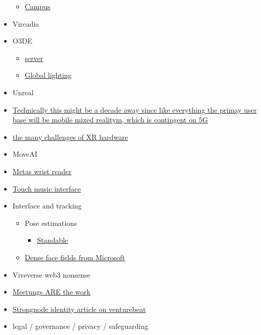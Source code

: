 \begin{itemize}
  \begin{itemize}
   
  \item
    \href{https://techcrunch-com.cdn.ampproject.org/c/s/techcrunch.com/2022/09/09/roblox-rdc-2022/amp/}{Campus}
  \end{itemize}
\item
  Vircadia
\item
  O3DE

  \begin{itemize}
   
  \item
    \href{https://www.reddit.com/r/O3DE/comments/pbovl9/can_i_develop_my_own_dedicated_server_with_o3de/}{server}
  \item
    \href{https://www.co3dex.com/blog/image-based-lighting-1/\#/}{Global
    lighting}
  \end{itemize}
\item
  Unreal
\item
  \href{https://www.matthewball.vc/all/forwardtothemetaverseprimer}{Technically
  this might be a decade away since like everything the primay user base
  will be mobile mixed realitym, which is contingent on 5G}
\item
  \href{https://www.matthewball.vc/all/why-vrar-gets-farther-away-as-it-comes-into-focus}{the
  many challenges of XR hardware}
\item
  MoveAI
\item
  \href{https://www.from-the-interface.com/wrist-interfaces/}{Meta\textquotesingle s
  wrist reader}
\item
  \href{https://scitechdaily.com/groundbreaking-new-technology-allows-people-to-listen-to-music-through-touch/}{Touch
  music interface}
\item
  Interface and tracking

  \begin{itemize}
   
  \item
    Pose estimations

    \begin{itemize}
     
    \item
      \href{https://www.standablevr.com/}{Standable}
    \end{itemize}
  \item
    \href{https://microsoft.github.io/DenseLandmarks/}{Dense face fields
    from Microsoft}
  \end{itemize}
\item
  Viveverse web3 nonsense
\item
  \href{https://medium.com/@ElizAyer/meetings-are-the-work-9e429dde6aa3}{Meetungs
  ARE the work}
\item
  \href{https://venturebeat.com/virtual/identity-in-the-metaverse-creating-a-global-identity-system/}{Strongnode
  identity article on venturebeat}
\item
  legal / governance / privacy / safeguarding


\end{itemize}
